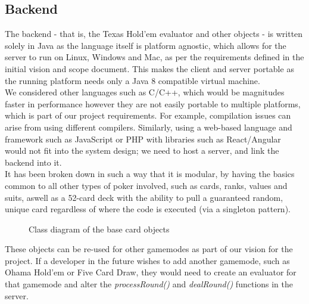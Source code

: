 \documentclass[11pt]{article}
\begin{document}
\newpage
\subsection{Backend}

The backend - that is, the Texas Hold'em evaluator and other objects - is written solely in Java as the language itself is platform agnostic, which allows for the server to run on Linux, Windows and Mac, as per the requirements defined in the initial vision and scope document. This makes the client and server portable as the running platform needs only a Java 8 compatible virtual machine.  \\

We considered other languages such as C/C++, which would be magnitudes faster in performance however they are not easily portable to multiple platforms, which is part of our project requirements. For example, compilation issues can arise from using different compilers. Similarly, using a web-based language and framework such as JavaScript or PHP with libraries such as React/Angular would not fit into the system design; we need to host a server, and link the backend into it. \\


It has been broken down in such a way that it is modular, by having the basics common to all other types of poker involved, such as cards, ranks, values and suits, aswell as a 52-card deck with the ability to pull a guaranteed random, unique card regardless of where the code is executed (via a singleton pattern). \\

	\begin{figure}[h]
%
\caption{Class diagram of the base card objects}
	\end{figure} 

These objects can be re-used for other gamemodes as part of our vision for the project. If a developer in the future wishes to add another gamemode, such as Ohama Hold'em or Five Card Draw, they would need to create an evaluator for that gamemode and alter the \textit{processRound()} and \textit{dealRound()} functions in the server.
\end{document}
